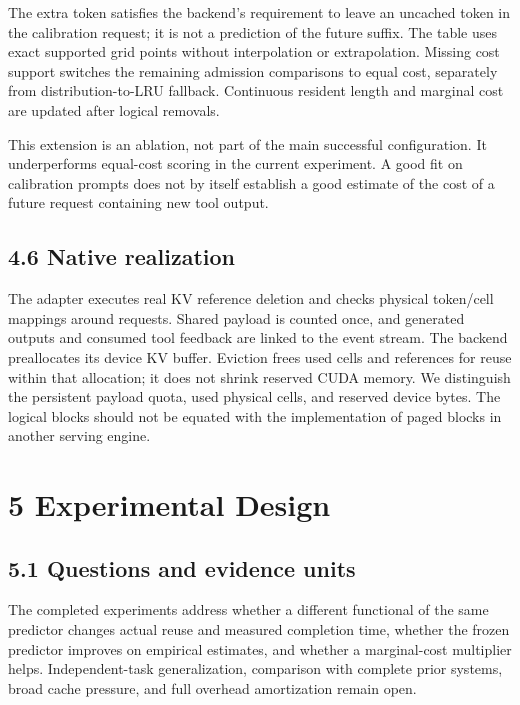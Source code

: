 \documentclass[
  english,
  10pt,
]{article}
\begin{document}
The extra token satisfies the backend's requirement to leave an uncached
token in the calibration request; it is not a prediction of the future
suffix. The table uses exact supported grid points without interpolation
or extrapolation. Missing cost support switches the remaining admission
comparisons to equal cost, separately from distribution-to-LRU fallback.
Continuous resident length and marginal cost are updated after logical
removals.

This extension is an ablation, not part of the main successful
configuration. It underperforms equal-cost scoring in the current
experiment. A good fit on calibration prompts does not by itself
establish a good estimate of the cost of a future request containing new
tool output.

\subsection{4.6 Native realization}\label{native-realization}

The adapter executes real KV reference deletion and checks physical
token/cell mappings around requests. Shared payload is counted once, and
generated outputs and consumed tool feedback are linked to the event
stream. The backend preallocates its device KV buffer. Eviction frees
used cells and references for reuse within that allocation; it does not
shrink reserved CUDA memory. We distinguish the persistent payload
quota, used physical cells, and reserved device bytes. The logical
blocks should not be equated with the implementation of paged blocks in
another serving engine.

\section{5 Experimental Design}\label{experimental-design}

\subsection{5.1 Questions and evidence
units}\label{questions-and-evidence-units}

The completed experiments address whether a different functional of the
same predictor changes actual reuse and measured completion time,
whether the frozen predictor improves on empirical estimates, and
whether a marginal-cost multiplier helps. Independent-task
generalization, comparison with complete prior systems, broad cache
pressure, and full overhead amortization remain open.
\end{document}
